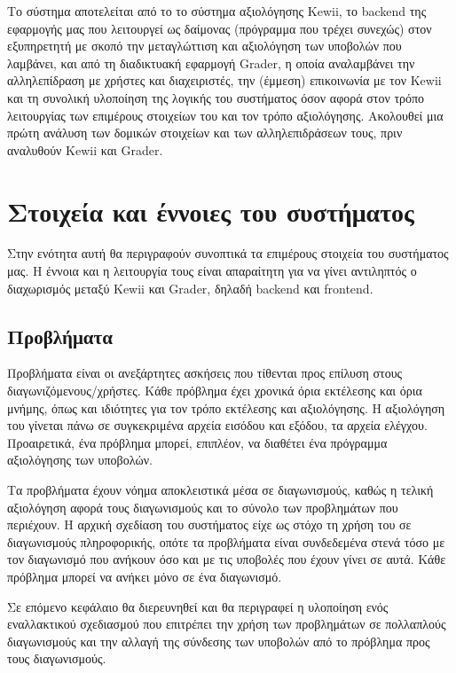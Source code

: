 \documentclass[diploma]{softlab-thesis}
\begin{document}
Το σύστημα αποτελείται από το το σύστημα αξιολόγησης Kewii, το backend της
εφαρμογής μας που λειτουργεί ως δαίμονας (πρόγραμμα που τρέχει συνεχώς) στον
εξυπηρετητή με σκοπό την μεταγλώττιση και αξιολόγηση των υποβολών που λαμβάνει,
και από τη διαδικτυακή εφαρμογή Grader, η οποία αναλαμβάνει την αλληλεπίδραση
με χρήστες και διαχειριστές, την (έμμεση) επικοινωνία με τον Kewii και τη
συνολική υλοποίηση της λογικής του συστήματος όσον αφορά στον τρόπο λειτουργίας
των επιμέρους στοιχείων του και τον τρόπο αξιολόγησης. Ακολουθεί μια πρώτη
ανάλυση των δομικών στοιχείων και των αλληλεπιδράσεων τους, πριν αναλυθούν Kewii
και Grader.

\section{Στοιχεία και έννοιες του συστήματος}

Στην ενότητα αυτή θα περιγραφούν συνοπτικά τα επιμέρους στοιχεία του συστήματος
μας. Η έννοια και η λειτουργία τους είναι απαραίτητη για να γίνει αντιληπτός ο
διαχωρισμός μεταξύ Kewii και Grader, δηλαδή backend και frontend.

\subsection{Προβλήματα}

Προβλήματα είναι οι ανεξάρτητες ασκήσεις που τίθενται προς επίλυση στους
διαγωνιζόμενους/χρήστες. Κάθε πρόβλημα έχει χρονικά όρια εκτέλεσης και όρια
μνήμης, όπως και ιδιότητες για τον τρόπο εκτέλεσης και αξιολόγησης. Η
αξιολόγηση του γίνεται πάνω σε συγκεκριμένα αρχεία εισόδου και εξόδου, τα
αρχεία ελέγχου. Προαιρετικά, ένα πρόβλημα μπορεί, επιπλέον, να διαθέτει ένα
πρόγραμμα αξιολόγησης των υποβολών.

\bigskip

Τα προβλήματα έχουν νόημα αποκλειστικά μέσα σε διαγωνισμούς, καθώς η τελική
αξιολόγηση αφορά τους διαγωνισμούς και το σύνολο των προβλημάτων που περιέχουν.
Η αρχική σχεδίαση του συστήματος είχε ως στόχο τη χρήση του σε διαγωνισμούς
πληροφορικής, οπότε τα προβλήματα είναι συνδεδεμένα στενά τόσο με τον
διαγωνισμό που ανήκουν όσο και με τις υποβολές που έχουν γίνει σε αυτά. Κάθε
πρόβλημα μπορεί να ανήκει μόνο σε ένα διαγωνισμό.

\bigskip

Σε επόμενο κεφάλαιο θα διερευνηθεί και θα περιγραφεί η υλοποίηση ενός εναλλακτικού
σχεδιασμού που επιτρέπει την χρήση των προβλημάτων σε πολλαπλούς διαγωνισμούς και
την αλλαγή της σύνδεσης των υποβολών από το πρόβλημα προς τους διαγωνισμούς.
\end{document}
